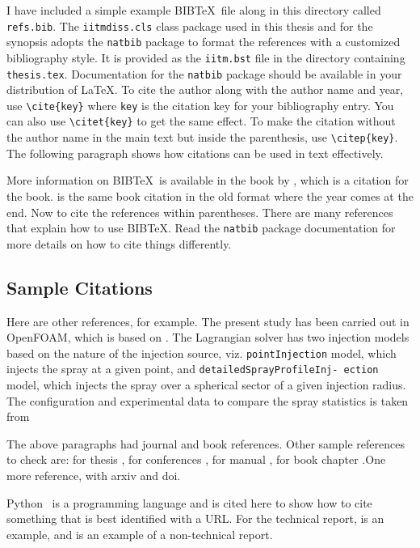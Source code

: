 I have included a simple example BIB\TeX\ file along in this directory called \verb+refs.bib+.  The \verb+iitmdiss.cls+ class package used in this thesis and for the synopsis adopts the \verb+natbib+ package to format the references with a customized bibliography style. It is provided as the \verb+iitm.bst+ file in the directory containing \verb+thesis.tex+.  Documentation for the \verb+natbib+ package should be available in your distribution of \LaTeX.  To cite the author along with the author name and year, use \verb+\cite{key}+ where \verb+key+ is the citation key for your bibliography entry.  You can also use \verb+\citet{key}+ to get the same effect.  To make the citation without the author name in the main text but inside the parenthesis, use \verb+\citep{key}+.  The following paragraph shows how citations can be used in text effectively.

More information on BIB\TeX\ is available in the book by \cite{lamport:86}, which is a citation for the book. \cite{lamport1:86} is the same book citation in the old format where the year comes at the end. Now to cite the references within parentheses. There are many references~\citep{lamport:86} that explain how to use BIB\TeX.  Read the \verb+natbib+ package documentation for more details on how to cite things differently.

\subsection{Sample Citations}

Here are other references, for example.  The present study has been carried out in OpenFOAM, which is based on \cite{Weller1998}. The Lagrangian solver has two injection models based on the nature of the injection source, viz. \texttt{pointInjection} model, which injects the spray at a given point, and \texttt{detailedSprayProfileInj- ection} model, which injects the spray over a spherical sector of a given injection radius. The configuration and experimental data to compare the spray statistics is taken from \cite{Zhou2015a}

The above paragraphs had journal and book references. Other sample references to check are: for thesis \cite{Syed2013,Cheekati2014,Syed2020}, for conferences \cite{Sasidharan2017,Syed2018,Syed2018a}, for manual \cite{Ayachit2015},  for book chapter \cite{Ahren2005}.One more reference, \cite{Roenby2016} with arxiv and doi.

Python~\citep{py:python} is a programming language and is cited here to show how to cite something that is best identified with a URL. For the technical report, \cite{Syed2015} is an example, and \cite{UnitedNations2019} is an example of a non-technical report.

